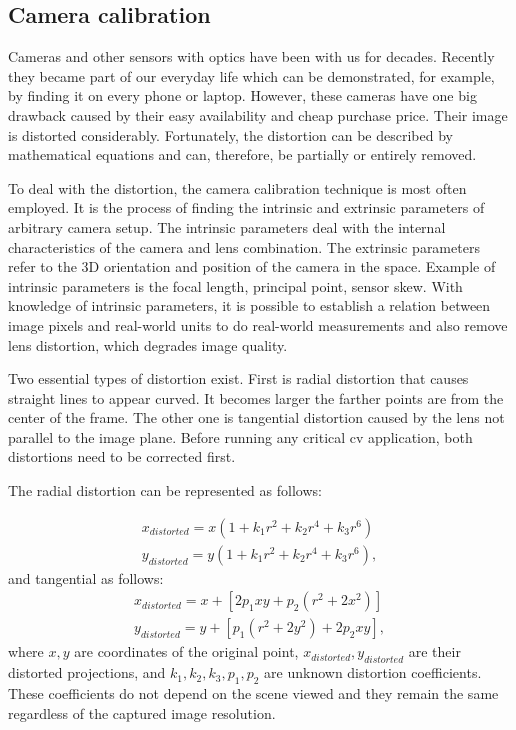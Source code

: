     
    \subsection{Camera calibration}\label{camera_calibration}
        Cameras and other sensors with optics have been with us for decades. Recently they became part of our everyday life which can be demonstrated, for example, by finding it on every phone or laptop. However, these cameras have one big drawback caused by their easy availability and cheap purchase price. Their image is distorted considerably. Fortunately, the distortion can be described by mathematical equations and can, therefore, be partially or entirely removed. 
        
        To deal with the distortion, the camera calibration technique is most often employed. It is the process of finding the intrinsic and extrinsic parameters of arbitrary camera setup. The intrinsic parameters deal with the internal characteristics of the camera and lens combination. The extrinsic parameters refer to the 3D orientation and position of the camera in the space. Example of intrinsic parameters is the focal length, principal point, sensor skew. With knowledge of intrinsic parameters, it is possible to establish a relation between image pixels and real-world units to do real-world measurements and also remove lens distortion, which degrades image quality. 
        
        Two essential types of distortion exist. First is radial distortion that causes straight lines to appear curved. It becomes larger the farther points are from the center of the frame. The other one is tangential distortion caused by the lens not parallel to the image plane. Before running any critical \gls{cv} application, both distortions need to be corrected first. 
        
        The radial distortion can be represented as follows:

        \begin{align}
            x_{distorted} = x( 1 + k_1 r^2 + k_2 r^4 + k_3 r^6) \\ 
            y_{distorted} = y( 1 + k_1 r^2 + k_2 r^4 + k_3 r^6),
        \end{align}
        and tangential as follows:
        \begin{align}
            x_{distorted} = x + [ 2p_1xy + p_2(r^2+2x^2)] \\
            y_{distorted} = y + [ p_1(r^2+ 2y^2)+ 2p_2xy],
        \end{align}
        where $x, y$ are coordinates of the original point, $x_{distorted}, y_{distorted}$ are their distorted projections, and $k_1, k_2, k_3, p_1, p_2$ are unknown distortion coefficients. These coefficients do not depend on the scene viewed and they remain the same regardless of the captured image resolution.
        
